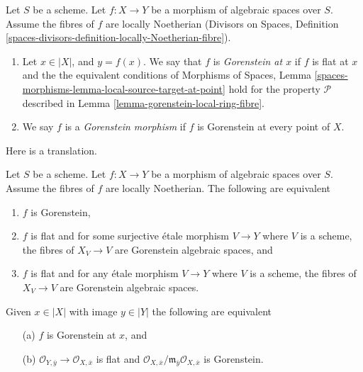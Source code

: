 \begin{definition}
\label{definition-gorenstein}
Let $S$ be a scheme.
Let $f : X \to Y$ be a morphism of algebraic spaces over $S$.
Assume the fibres of $f$ are locally Noetherian
(Divisors on Spaces, Definition
\ref{spaces-divisors-definition-locally-Noetherian-fibre}).
\begin{enumerate}
\item Let $x \in |X|$, and $y = f(x)$. We say that $f$ is
{\it Gorenstein at $x$} if $f$ is flat at $x$ and the
the equivalent conditions of
Morphisms of Spaces, Lemma
\ref{spaces-morphisms-lemma-local-source-target-at-point}
hold for the property $\mathcal{P}$ described in
Lemma \ref{lemma-gorenstein-local-ring-fibre}.
\item We say $f$ is a {\it Gorenstein morphism} if $f$ is
Gorenstein at every point of $X$.
\end{enumerate}
\end{definition}

\noindent
Here is a translation.

\begin{lemma}
\label{lemma-gorenstein}
Let $S$ be a scheme. Let $f : X \to Y$ be a morphism of algebraic spaces
over $S$. Assume the fibres of $f$ are locally Noetherian.
The following are equivalent
\begin{enumerate}
\item $f$ is Gorenstein,
\item $f$ is flat and for some surjective \'etale morphism $V \to Y$
where $V$ is a scheme, the fibres of $X_V \to V$
are Gorenstein algebraic spaces, and
\item $f$ is flat and for any \'etale morphism $V \to Y$
where $V$ is a scheme, the fibres of $X_V \to V$
are Gorenstein algebraic spaces.
\end{enumerate}
Given $x \in |X|$ with image $y \in |Y|$ the following are
equivalent
\begin{enumerate}
\item[(a)] $f$ is Gorenstein at $x$, and
\item[(b)] $\mathcal{O}_{Y, \overline{y}} \to \mathcal{O}_{X, \overline{x}}$
is flat and
$\mathcal{O}_{X, \overline{x}}/
\mathfrak m_{\overline{y}}\mathcal{O}_{X, \overline{x}}$ is Gorenstein.
\end{enumerate}
\end{lemma}

